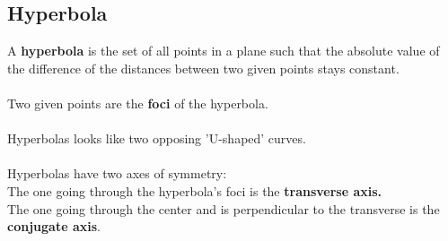 \subsection{Hyperbola}
A \textbf{hyperbola} is the set of all points in a plane such that the absolute value of the difference of the distances between two given points stays constant.\\
\\Two given points are the \textbf{foci} of the hyperbola.\\
\\Hyperbolas looks like two opposing 'U-shaped' curves.\\
\\Hyperbolas have two axes of symmetry:\\ The one going through the hyperbola's foci is the \textbf{transverse axis.}\\ The one going through the center and is perpendicular to the transverse is the \textbf{conjugate axis}.

